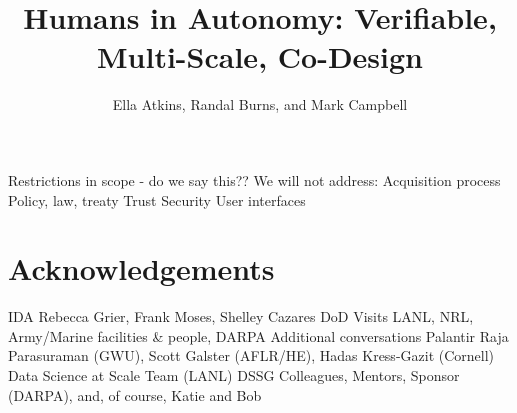\documentclass[11pt]{dssg}
\begin{document}
\title{Humans in Autonomy: Verifiable, Multi-Scale, Co-Design}

\author{Ella Atkins, Randal Burns, and Mark Campbell}


\maketitle









Restrictions in scope - do we say this?? We will not address:
Acquisition process
Policy, law, treaty
Trust
Security
User interfaces





%







\section*{Acknowledgements}
IDA
Rebecca Grier, Frank Moses, Shelley Cazares
DoD Visits
LANL, NRL, Army/Marine facilities \& people, DARPA
Additional conversations
Palantir
Raja Parasuraman (GWU), Scott Galster (AFLR/HE), Hadas Kress-Gazit (Cornell)
Data Science at Scale Team (LANL)
DSSG Colleagues, Mentors, Sponsor (DARPA), and, of course, Katie and Bob




\newpage


\normalsize
\end{document}
